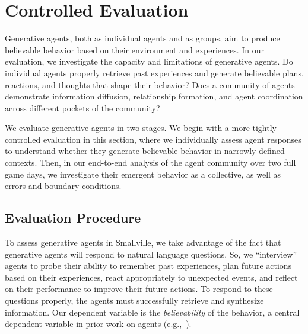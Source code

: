 \section{Controlled Evaluation}
Generative agents, both as individual agents and as groups, aim to produce believable behavior based on their environment and experiences. In our evaluation, we investigate the capacity and limitations of generative agents. Do individual agents properly retrieve past experiences and generate believable plans, reactions, and thoughts that shape their behavior? Does a community of agents demonstrate information diffusion, relationship formation, and agent coordination across different pockets of the community?

We evaluate generative agents in two stages. We begin with a more tightly controlled evaluation in this section, where we individually assess agent responses to understand whether they generate believable behavior in narrowly defined contexts. Then, in our end-to-end analysis of the agent community over two full game days, we investigate their emergent behavior as a collective, as well as errors and boundary conditions.

\subsection{Evaluation Procedure}
To assess generative agents in Smallville, we take advantage of the fact that generative agents will respond to natural language questions. So, we ``interview'' agents to probe their ability to remember past experiences, plan future actions based on their experiences, react appropriately to unexpected events, and reflect on their performance to improve their future actions. To respond to these questions properly, the agents must successfully retrieve and synthesize information. Our dependent variable is the \textit{believability} of the behavior, a central dependent variable in prior work on agents (e.g.,~\cite{22_bates1994role}). 

